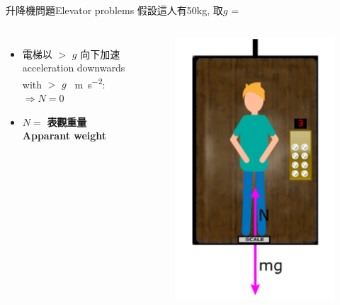 \documentclass[beamer=true]{standalone}
\begin{document}
\begin{frame}{升降機問題Elevator problems}
    假設這人有50kg, 取$g$ = 

    \begin{columns}
        \begin{itemize}
            \setlength{\itemsep}{15pt}

            \item 電梯以 $>$ $g$\acc{} 向下加速\\acceleration downwards with $>$ $g$ \qty{}{m.s^{-2}}: \\$\Rightarrow N=0$
            \item $N=$ \textbf{表觀重量} \textbf{Apparant weight}
        \end{itemize}
        \begin{figure}[h!]
            \centering
            \includegraphics[width=\textwidth]{assets/6596ff5b.png}
        \end{figure}
    \end{columns}
\end{frame}
\end{document}
